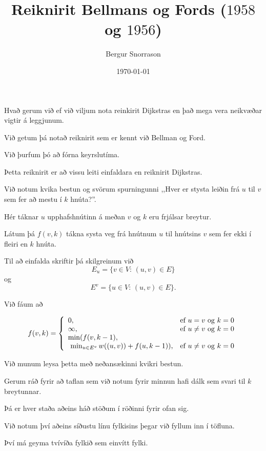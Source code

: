 \title{Reiknirit Bellmans og Fords ($1958$ og $1956$)}
\author{Bergur Snorrason}
\date{\today}



\frame{\titlepage}

{
	{
		\item<1-> Hvað gerum við ef við viljum nota reinkirit Dijkstras en það mega vera neikvæðar vigtir á leggjunum.
		\item<2-> Við getum þá notað reiknirit sem er kennt við Bellman og Ford.
		\item<3-> Við þurfum þó að fórna keyrslutíma.
	}
}

{
	{
		\item<1-> Þetta reiknirit er að vissu leiti einfaldara en reiknirit Dijkstras.
		\item<2-> Við notum kvika bestun og svörum spurningunni ,,Hver er stysta leiðin frá $u$ til $v$ sem fer að mestu í $k$ hnúta?''.
		\item<3-> Hér táknar $u$ upphafshnútinn á meðan $v$ og $k$ eru frjálsar breytur.
		\item<5-> Látum þá $f(v, k)$ tákna systa veg frá hnútnum $u$ til hnútsins $v$ sem fer ekki í fleiri en $k$ hnúta.
		\item<6-> Til að einfalda skriftir þá skilgreinum við
					\[
						E_u = \{v \in V:\, (u, v) \in E\}
					\]
					og
					\[
						E^v = \{u \in V:\, (u, v) \in E\}.
					\]
		\item<7-> Við fáum að
	}
	{
					\[
						f(v, k) = \left \{
						\env{array}
						{ {l l}
							0, & \text{ef $u = v$ og $k = 0$}\\
							\infty, & \text{ef $u \neq v$ og $k = 0$}\\
							\min(f(v, k - 1), & \\
							\ \min_{u \in E^v} w((u, v)) + f(u, k - 1)), & \text{ef $u \neq v$ og $k = 0$}\\
						}
						\right .
					\]
	}
}

{
	{
		\item<1-> Við munum leysa þetta með neðansækinni kvikri bestun.
		\item<2-> Gerum ráð fyrir að taflan sem við notum fyrir minnun hafi dálk sem svari til $k$ breytunnar.
		\item<3-> Þá er hver staða aðeins háð stöðum í röðinni fyrir ofan sig.
		\item<4-> Við notum því aðeins síðustu línu fylkisins þegar við fyllum inn í töfluna.
		\item<5-> Því má geyma tvívíða fylkið sem einvítt fylki.
	}
}

